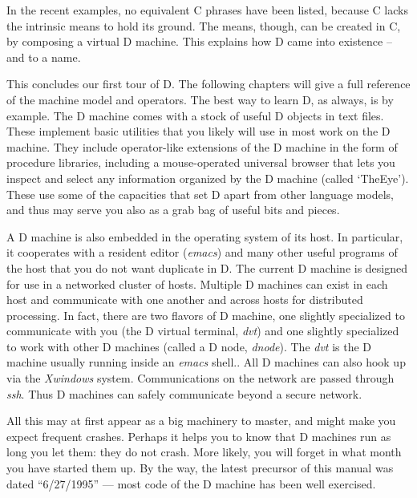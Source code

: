 In  the  recent  examples,  no equivalent C phrases  have  been  listed, because  C  lacks  the intrinsic means to hold  its  ground.  The  means, though,  can be created in C, by composing a virtual D machine. This explains how D came into existence -- and to a name.

This concludes our first tour of D. The following chapters will give a full reference of the machine model and operators.  The best way to learn D,  as always,  is by example.  The D machine comes with a stock of useful D objects in text files. These implement basic utilities that you likely will use in most work on the D machine. They include operator-like extensions of  the D machine in the form of procedure libraries, including a mouse-operated universal browser that lets you inspect and select any information organized by the D machine (called `TheEye'). These use some of the capacities that set D apart from other language models, and thus may serve you also as a grab bag of useful bits and pieces.

A D machine is also embedded in the operating system of its host. In particular, it cooperates with a resident editor (\emph{emacs}) and many other useful programs of the host that you do not want duplicate in D. The current D machine is designed for use in a networked cluster of hosts. Multiple D machines can exist in each host and communicate with one another and across hosts for distributed processing. In fact, there are two flavors of D machine, one slightly specialized to communicate with you (the D virtual terminal, \emph{dvt}) and one slightly specialized to work with other D machines (called a D node, \emph{dnode}). The \emph{dvt} is the D machine usually running inside an \emph{emacs} shell.. All D machines can also hook up via the \emph{Xwindows} system. Communications on the network are passed through \emph{ssh}. Thus D machines can safely communicate beyond a secure network.

All this may at first appear as a big machinery to master, and might make you expect frequent crashes. Perhaps it helps you to know that D machines run as long you let them: they do not crash. More likely, you will forget in what month you have started them up. By the way, the latest precursor of this manual was dated ``6/27/1995'' --- most code of the D machine has been well exercised.
